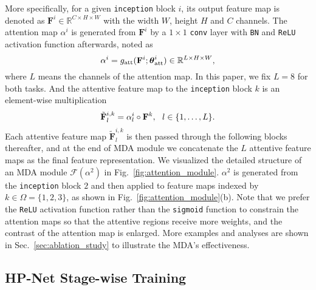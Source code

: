 \documentclass[10pt,twocolumn,letterpaper]{article}
\begin{document}
More specifically, for a given \texttt{inception} block $i$, its output feature map is denoted as $\mathbf{F}^i \in \mathbb{R}^{C \times H \times W}$ with the width $W$, height $H$ and $C$ channels.
The attention map $\alpha^i$ is generated from $\mathbf{F}^i$ by a $1\times1$ \texttt{conv} layer with \texttt{BN} and \texttt{ReLU} activation function afterwards, noted as
\begin{equation}
\label{eq:attention_map}
\vspace{-1pt}
\alpha^i = g_\mathrm{att}(\mathbf{F}^i; \boldsymbol\theta^i_{\mathrm{att}}) \in \mathbb{R}^{L\times H \times W},
\vspace{-1pt}
\end{equation}
where $L$ means the channels of the attention map.
In this paper, we fix $L=8$ for both tasks.
And the attentive feature map to the \texttt{inception} block $k$ is an element-wise multiplication
\begin{equation}
\label{eq:attentive_features}
\vspace{-1pt}
\tilde{\mathbf{F}}^{i,k}_l = \alpha^i_l \circ \mathbf{F}^{k}, ~~l\in\lbrace1,\ldots,L\rbrace.
\vspace{-1pt}
\end{equation}
Each attentive feature map $\tilde{\mathbf{F}}^{i,k}_l$ is then passed through the following blocks thereafter, and at the end of MDA module we concatenate the $L$ attentive feature maps as the final feature representation.
We visualized the detailed structure of an MDA module $\mathcal{F}(\alpha^2)$ in Fig.~\ref{fig:attention_module}.
$\alpha^2$ is generated from the \texttt{inception} block $2$ and then applied to feature maps indexed by $k\in\Omega=\{1,2,3\}$, as shown in Fig.~\ref{fig:attention_module}(b).
Note that we prefer the \texttt{ReLU} activation function rather than the \texttt{sigmoid} function to constrain the attention maps so that the attentive regions receive more weights, and the contrast of the attention map is enlarged.
More examples and analyses are shown in Sec.~\ref{sec:ablation_study} to illustrate the MDA's effectiveness.



\subsection{HP-Net Stage-wise Training}
\label{subsec:stage_wise_training}
\end{document}
